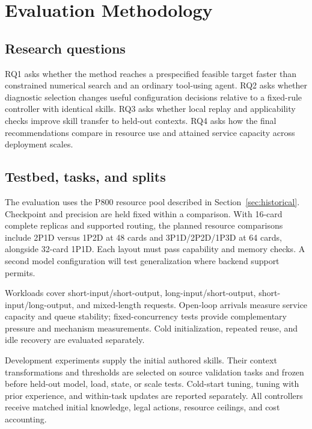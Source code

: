 \documentclass[preprint,12pt]{elsarticle}
\begin{document}
\section{Evaluation Methodology}
\subsection{Research questions}
RQ1 asks whether the method reaches a prespecified feasible target faster than constrained numerical search and an ordinary tool-using agent. RQ2 asks whether diagnostic selection changes useful configuration decisions relative to a fixed-rule controller with identical skills. RQ3 asks whether local replay and applicability checks improve skill transfer to held-out contexts. RQ4 asks how the final recommendations compare in resource use and attained service capacity across deployment scales.

\subsection{Testbed, tasks, and splits}
The evaluation uses the P800 resource pool described in Section~\ref{sec:historical}. Checkpoint and precision are held fixed within a comparison. With 16-card complete replicas and supported routing, the planned resource comparisons include 2P1D versus 1P2D at 48 cards and 3P1D/2P2D/1P3D at 64 cards, alongside 32-card 1P1D. Each layout must pass capability and memory checks. A second model configuration will test generalization where backend support permits.

Workloads cover short-input/short-output, long-input/short-output, short-input/long-output, and mixed-length requests. Open-loop arrivals measure service capacity and queue stability; fixed-concurrency tests provide complementary pressure and mechanism measurements. Cold initialization, repeated reuse, and idle recovery are evaluated separately.

Development experiments supply the initial authored skills. Their context transformations and thresholds are selected on source validation tasks and frozen before held-out model, load, state, or scale tests. Cold-start tuning, tuning with prior experience, and within-task updates are reported separately. All controllers receive matched initial knowledge, legal actions, resource ceilings, and cost accounting.
\end{document}
